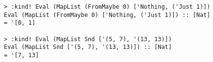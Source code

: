 \begin{repl}\begin{lstlisting}
> :kind! Eval (MapList (FromMaybe 0) ['Nothing, ('Just 1)])
Eval (MapList (FromMaybe 0) ['Nothing, ('Just 1)]) :: [Nat]
= '[0, 1]

> :kind! Eval (MapList Snd ['(5, 7), '(13, 13)])
Eval (MapList Snd ['(5, 7), '(13, 13)]) :: [Nat]
= '[7, 13]\end{lstlisting}\end{repl}

